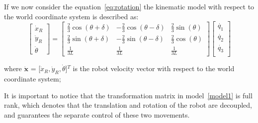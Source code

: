 If we now consider the equation~\ref{eq:rotation} the kinematic model with respect to the world coordinate system is described as:
\begin{equation}
\begin{bmatrix}
\dot{x}_R\\
\dot{y}_R\\
\dot{\theta}
\end{bmatrix} =
\begin{bmatrix}
\frac{2}{3}\cos(\theta+\delta) & -\frac{2}{3}\cos(\theta-\delta) & \frac{2}{3}\sin(\theta)\\
\frac{2}{3}\sin(\theta+\delta) & -\frac{2}{3}\sin(\theta-\delta) & \frac{2}{3}\cos(\theta)\\
\frac{1}{3L} & \frac{1}{3L} & \frac{1}{3L}
\end{bmatrix}
\begin{bmatrix}
\dot{q_1}\\
\dot{q_2}\\
\dot{q_3}\\
\end{bmatrix}	
\label{model2}
\end{equation}

where $\mathbf{\dot{x}}$ = [$\dot{x}_R,\dot{y}_R,\dot{\theta}$]$^T$ is the robot velocity vector with respect to the world coordinate system;

It is important to notice that the transformation matrix in model~\ref{model1} is full rank, which denotes that the translation and rotation of the robot are decoupled, and guarantees the separate control of these two movements.

